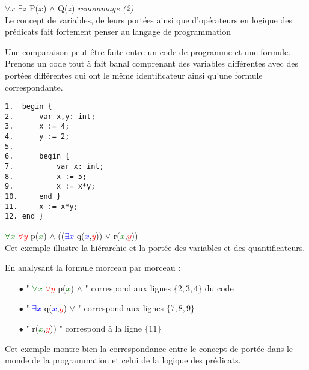 $\forall x$ $\exists z$  P($x$) $\wedge$ Q($z$)  \textit{renommage (2)} \\
 
Le concept de variables, de leurs portées ainsi que d'opérateurs en logique des prédicats fait fortement penser au langage de programmation
 
Une comparaison peut être faite entre un code de programme et une formule.
Prenons un code tout à fait banal comprenant des variables différentes avec des portées différentes qui ont le même identificateur ainsi qu'une formule correspondante. 

\begin{verbatim}
1.  begin {
2.      var x,y: int;        
3.      x := 4;
4.      y := 2;
5.    
6.      begin {
7.          var x: int;
8.          x := 5;
9.          x := x*y;
10.     end }
11.     x := x*y;
12. end }
\end{verbatim}


\textcolor{Green}{$\forall x$} \textcolor{Red}{$\forall y$} p(\textcolor{Green}{$x$}) $\wedge$ ((\textcolor{Blue}{$\exists x$}  q(\textcolor{Blue}{$x$},\textcolor{Red}{$y$})) $\vee$ r(\textcolor{Green}{$x$},\textcolor{Red}{$y$}))  \\ 

Cet exemple illustre la hiérarchie et la portée des variables et des quantificateurs.

En analysant la formule morceau par morceau : \\

\begin{itemize}

\item[$\bullet$] " \textcolor{Green}{$\forall x$} \textcolor{Red}{$\forall y$} p(\textcolor{Green}{$x$}) $\wedge$ " correspond aux lignes $\lbrace 2,3,4 \rbrace$ du code \\

\item[$\bullet$]" \textcolor{Blue}{$\exists x$}  q(\textcolor{Blue}{$x$},\textcolor{Red}{$y$}) $\vee$ " correspond aux lignes $\lbrace 7,8,9 \rbrace$ \\
 
\item[$\bullet$]" r(\textcolor{Green}{$x$},\textcolor{Red}{$y$})) "  correspond à la ligne $\lbrace 11 \rbrace$ \\

\end{itemize}

Cet exemple montre bien la correspondance entre le concept de portée
dans le monde de la programmation et celui de la logique des prédicats.

